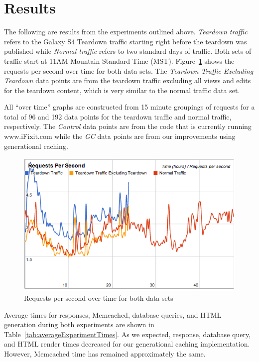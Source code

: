 \documentclass[12pt]{ucthesis}
\begin{document}
\section{Results} \label{results}
The following are results from the experiments outlined above.
\textit{Teardown traffic} refers to the Galaxy S4 Teardown traffic starting right before the teardown was published while \textit{Normal traffic} refers to two standard days of traffic.
Both sets of traffic start at 11AM Mountain Standard Time (MST).
Figure~\ref{fig:requestsPerSecXTime} shows the requests per second over time for both data sets.
The \textit{Teardown Traffic Excluding Teardown} data points are from the teardown traffic excluding all views and edits for the teardown content, which is very similar to the normal traffic data set.

All ``over time'' graphs are constructed from 15 minute groupings of requests for a total of 96 and 192 data points for the teardown traffic and normal traffic, respectively.
The \textit{Control} data points are from the code that is currently running \textsf{www.iFixit.com} while the \textit{GC} data points are from our improvements using generational caching.

\begin{figure}[h]
\centering
\includegraphics[width=\textwidth]{assets/requestsPerSecXTime.png}
\caption{Requests per second over time for both data sets}
\label{fig:requestsPerSecXTime}
\end{figure}

Average times for responses, \textsf{Memcached}, database queries, and HTML generation during both experiments are shown in Table~\ref{tab:averageExperimentTimes}.
As we expected, response, database query, and HTML render times decreased for our generational caching implementation.
However, \textsf{Memcached} time has remained approximately the same.
\end{document}
